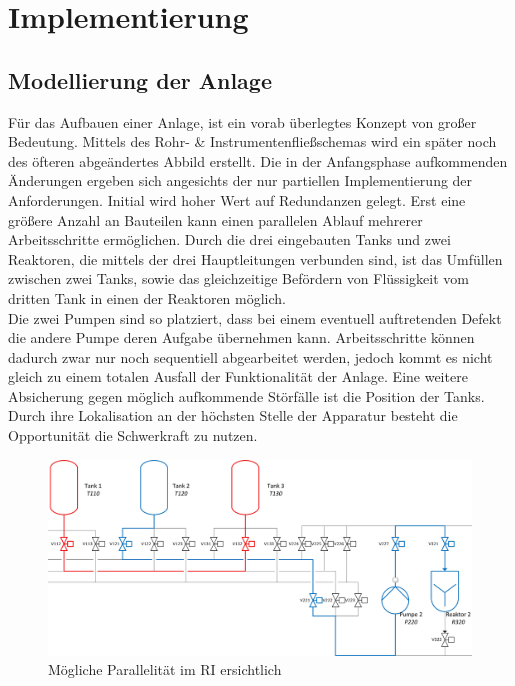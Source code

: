\chapter{Implementierung} \label{chapter:thevetestcase}
\section{Modellierung der Anlage}
Für das Aufbauen einer Anlage, ist ein vorab überlegtes Konzept von großer Bedeutung. Mittels des Rohr- \& Instrumentenfließschemas wird ein später noch des öfteren abgeändertes Abbild erstellt. Die in der Anfangsphase aufkommenden Änderungen ergeben sich angesichts der nur partiellen Implementierung der Anforderungen. Initial wird hoher Wert auf Redundanzen gelegt. Erst eine größere Anzahl an Bauteilen kann einen parallelen Ablauf mehrerer Arbeitsschritte ermöglichen. Durch die drei eingebauten Tanks und zwei Reaktoren, die mittels der drei Hauptleitungen verbunden sind, ist das Umfüllen zwischen zwei Tanks, sowie das gleichzeitige Befördern von Flüssigkeit vom dritten Tank in einen der Reaktoren möglich.\\

Die zwei Pumpen sind so platziert, dass bei einem eventuell auftretenden Defekt die andere Pumpe deren Aufgabe übernehmen kann. Arbeitsschritte können dadurch zwar nur noch sequentiell abgearbeitet werden, jedoch kommt es nicht gleich zu einem totalen Ausfall der Funktionalität der Anlage. Eine weitere Absicherung gegen möglich aufkommende Störfälle ist die Position der Tanks. Durch ihre Lokalisation an der höchsten Stelle der Apparatur besteht die Opportunität die Schwerkraft zu nutzen.\\

\begin{figure}[h!]
  \centering
  \includegraphics[width=1\textwidth]{graphics/implementation/RI_Impl_cropped.jpg}
  \caption{Mögliche Parallelität im RI ersichtlich}
\end{figure}

